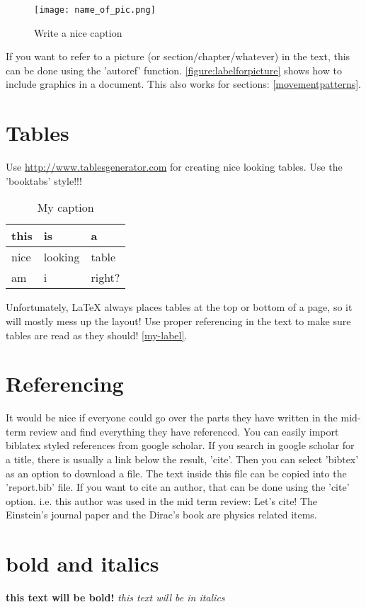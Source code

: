 \begin{figure}[H]
\centering
\texttt{[image: name\_of\_pic.png]}
\captionsetup{justification=centering}
\caption{Write a nice caption}
\label{figure:labelforpicture}
\end{figure}

If you want to refer to a picture (or section/chapter/whatever) in the text, this can be done using the 'autoref' function. \autoref{figure:labelforpicture} shows how to include graphics in a document. This also works for sections: \autoref{movementpatterns}.

\section{Tables}
Use \url{http://www.tablesgenerator.com} for creating nice looking tables. Use the 'booktabs' style!!!
\begin{table}[H]
\centering
\caption{My caption}
\label{my-label}
\begin{tabular}{@{}lll@{}}
\toprule
this & is      & a      \\ \midrule
nice & looking & table  \\
am   & i       & right? \\ \bottomrule
\end{tabular}
\end{table}
Unfortunately, LaTeX always places tables at the top or bottom of a page, so it will mostly mess up the layout! Use proper referencing in the text to make sure tables are read as they should! \autoref{my-label}.

\section{Referencing}
It would be nice if everyone could go over the parts they have written in the mid-term review and find everything they have referenced. You can easily import biblatex styled references from google scholar. If you search in google scholar for a title, there is usually a link below the result, 'cite'. Then you can select 'bibtex' as an option to download a file. The text inside this file can be copied into the 'report.bib' file. If you want to cite an author, that can be done using the 'cite' option. i.e. this author was used in the mid term review:
Let's cite! The Einstein's journal paper \cite{mautz2012indoor} and the Dirac's 
book \cite{meneses2012large} are physics related items. 

\section{bold and italics}
\textbf{this text will be bold!}
\textit{this text will be in italics}




